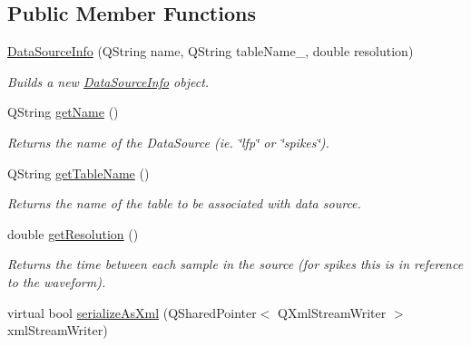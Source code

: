 \subsection*{Public Member Functions}
\begin{DoxyCompactItemize}
\item 
\hyperlink{class_picto_1_1_data_source_info_a3f4033402447a5c8e6c038c3fae230ce}{Data\-Source\-Info} (Q\-String name, Q\-String table\-Name\-\_\-, double resolution)
\begin{DoxyCompactList}\small\item\em Builds a new \hyperlink{class_picto_1_1_data_source_info}{Data\-Source\-Info} object. \end{DoxyCompactList}\item 
\hypertarget{class_picto_1_1_data_source_info_a241874c348d86429a08d60ff6dd9b79e}{Q\-String \hyperlink{class_picto_1_1_data_source_info_a241874c348d86429a08d60ff6dd9b79e}{get\-Name} ()}\label{class_picto_1_1_data_source_info_a241874c348d86429a08d60ff6dd9b79e}

\begin{DoxyCompactList}\small\item\em Returns the name of the Data\-Source (ie. \char`\"{}lfp\char`\"{} or \char`\"{}spikes\char`\"{}). \end{DoxyCompactList}\item 
\hypertarget{class_picto_1_1_data_source_info_afab4d134fdc486154bbeebeed45d0b2b}{Q\-String \hyperlink{class_picto_1_1_data_source_info_afab4d134fdc486154bbeebeed45d0b2b}{get\-Table\-Name} ()}\label{class_picto_1_1_data_source_info_afab4d134fdc486154bbeebeed45d0b2b}

\begin{DoxyCompactList}\small\item\em Returns the name of the table to be associated with data source. \end{DoxyCompactList}\item 
\hypertarget{class_picto_1_1_data_source_info_a205f79b8f19d2c86071c77571af3969a}{double \hyperlink{class_picto_1_1_data_source_info_a205f79b8f19d2c86071c77571af3969a}{get\-Resolution} ()}\label{class_picto_1_1_data_source_info_a205f79b8f19d2c86071c77571af3969a}

\begin{DoxyCompactList}\small\item\em Returns the time between each sample in the source (for spikes this is in reference to the waveform). \end{DoxyCompactList}\item 
\hypertarget{class_picto_1_1_data_source_info_a5b99119b0fc8d27afd2b1b7a7e129b1e}{virtual bool \hyperlink{class_picto_1_1_data_source_info_a5b99119b0fc8d27afd2b1b7a7e129b1e}{serialize\-As\-Xml} (Q\-Shared\-Pointer$<$ Q\-Xml\-Stream\-Writer $>$ xml\-Stream\-Writer)}\label{class_picto_1_1_data_source_info_a5b99119b0fc8d27afd2b1b7a7e129b1e}


\end{DoxyCompactItemize}
